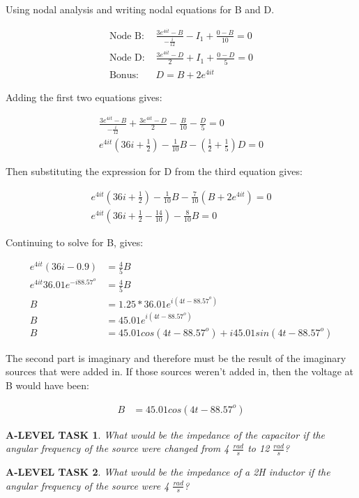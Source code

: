 \documentclass{book}
\numberwithin{equation}{section}
\newtheorem{alevel}{A-LEVEL TASK}
\theoremstyle{definition}
\begin{document}
Using nodal analysis and writing nodal equations for B and D.

\begin{align*}
\text{Node B: }&\frac{3e^{4it}-B}{-\frac{i}{12}}-I_1+\frac{0-B}{10}=0\\
\text{Node D: }&\frac{3e^{4it}-D}{2}+I_1+\frac{0-D}{5}=0\\
\text{Bonus: }&D=B+2e^{4it}
\end{align*}

Adding the first two equations gives:

\begin{align*}
\frac{3e^{4it}-B}{-\frac{i}{12}}+\frac{3e^{4it}-D}{2}-\frac{B}{10}-\frac{D}{5}=0\\
e^{4it}(36i+\frac{1}{2})-\frac{1}{10}B-(\frac{1}{2}+\frac{1}{5})D=0
\end{align*}

Then substituting the expression for D from the third equation gives:

\begin{align*}
e^{4it}(36i+\frac{1}{2})-\frac{1}{10}B-\frac{7}{10}(B+2e^{4it})=0\\
e^{4it}(36i+\frac{1}{2}-\frac{14}{10})-\frac{8}{10}B=0
\end{align*}

Continuing to solve for B, gives:

\begin{align*}
e^{4it}(36i-0.9)&=\frac{4}{5}B\\
e^{4it}36.01e^{-i88.57^o}&=\frac{4}{5}B\\
B&=1.25*36.01e^{i(4t-88.57^o)}\\
B&=45.01e^{i(4t-88.57^o)}\\
B&=45.01cos(4t-88.57^o)+i45.01sin(4t-88.57^o)
\end{align*}

The second part is imaginary and therefore must be the result of the imaginary sources that were added in. If those sources weren't added in, then the voltage at B would have been: 

\begin{align}
B&=45.01cos(4t-88.57^o)
\end{align}

\begin{alevel}
What would be the impedance of the capacitor if the angular frequency of the source were changed from 4 $\frac{rad}{s}$ to 12 $\frac{rad}{s}$?
\end{alevel}

\begin{alevel}
What would be the impedance of a 2H inductor if the angular frequency of the source were 4 $\frac{rad}{s}$?
\end{alevel}
\end{document}
